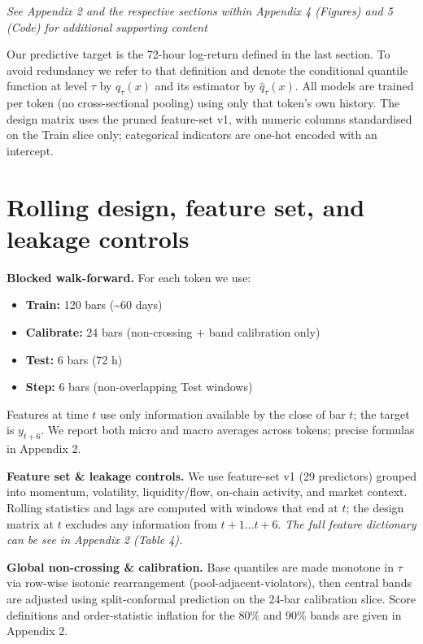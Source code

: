 \documentclass[
  a4paper,
  DIV=11,
  numbers=noendperiod]{scrreprt}
\providecommand{\tightlist}{%
  \setlength{\itemsep}{0pt}\setlength{\parskip}{0pt}}
\begin{document}
\emph{See Appendix 2 and the respective sections within Appendix 4
(Figures) and 5 (Code) for additional supporting content}

Our predictive target is the 72-hour log-return defined in the last
section. To avoid redundancy we refer to that definition and denote the
conditional quantile function at level \(\tau\) by \(q_\tau(x)\) and its
estimator by \(\widehat q_\tau(x)\). All models are trained per token
(no cross-sectional pooling) using only that token's own history. The
design matrix uses the pruned feature-set v1, with numeric columns
standardised on the Train slice only; categorical indicators are one-hot
encoded with an intercept.

\section{Rolling design, feature set, and leakage
controls}\label{sec-rolling}

\textbf{Blocked walk-forward.} For each token we use:

\begin{itemize}
\tightlist
\item
  \textbf{Train:} 120 bars (\textasciitilde60 days)\\
\item
  \textbf{Calibrate:} 24 bars (non-crossing + band calibration only)\\
\item
  \textbf{Test:} 6 bars (72 h)\\
\item
  \textbf{Step:} 6 bars (non-overlapping Test windows)
\end{itemize}

Features at time \(t\) use only information available by the close of
bar \(t\); the target is \(y_{t+6}\). We report both micro and macro
averages across tokens; precise formulas in Appendix 2.

\textbf{Feature set \& leakage controls.} We use feature-set v1 (29
predictors) grouped into momentum, volatility, liquidity/flow, on-chain
activity, and market context. Rolling statistics and lags are computed
with windows that end at \(t\); the design matrix at \(t\) excludes any
information from \(t{+}1…t{+}6\). \emph{The full feature dictionary can
be see in Appendix 2 (Table 4).}

\textbf{Global non-crossing \& calibration.} Base quantiles are made
monotone in \(\tau\) via row-wise isotonic rearrangement
(pool-adjacent-violators), then central bands are adjusted using
split-conformal prediction on the 24-bar calibration slice. Score
definitions and order-statistic inflation for the 80\% and 90\% bands
are given in Appendix 2.
\end{document}
